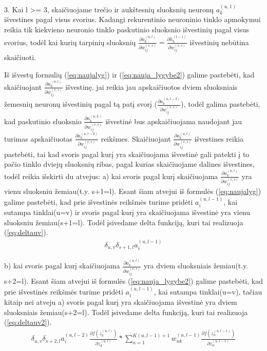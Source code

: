 3. Kai l >= 3, skaičiuojame trečio ir aukštesnių sluoksnių neuronų $a_k^{(u,1)}$ išvestines pagal visus svorius. Kadangi rekurentinio neuroninio tinklo apmokymui reikia tik kiekvieno neuronio tinklo paskutinio sluoksnio išvestinių pagal visus svorius, todėl kai kurių tarpinių sluoksnių $\frac{\partial a_k^{(u, l)}}{\partial w_{ij}^{(v,s)}} = \frac{\partial h_k^{(t-1)}}{\partial w_{ij}^{(v,s)}}$ išvestinių nebūtina skaičiuoti.

Iš išvestų formulių (\ref{eq:naujalyg}) ir (\ref{eq:nauja_lygybe2}) galime pastebėti, kad skaičiuojant $\frac{\partial a_k^{(u, l)}}{\partial w_{ij}^{(v,s)}}$ išvestinę, jai reikia jau apskaičiuotos dviem sluoksniais žemesnių neuronų išvestinių pagal tą patį svorį ($\frac{\partial a_k^{(u, l-2)}}{\partial w_{ij}^{(v,s)}}$), todėl galima pastebėti, kad paskutinio sluoksnio $\frac{\partial a_k^{(u, L)}}{\partial w_{ij}^{(v,s)}}$ išvestinė bus apskaičiuojama naudojant jau turimas apskaičiuotas  $\frac{\partial a_k^{(u, l-2)}}{\partial w_{ij}^{(v,s)}}$ reikšmes. Skaičiuojant $\frac{\partial a_k^{(u, l)}}{\partial w_{ij}^{(v,s)}}$ išvestines reikia pastebėti, tai kad svoris pagal kurį yra skaičiuojama išvestinė gali patekti į to pačio tinklo dviejų sluoksnių ribas, pagal kurias skaičiuojame dalines išvestines, todėl reikia išskirti du atvejus:
  a) kai svoris pagal kurį skaičiuojama $\frac{\partial a_k^{(u, l)}}{\partial w_{ij}^{(v,s)}}$ yra vienu sluoksniu žemiau(t.y. s+1=l).
    Esant šiam atvejui iš formulės (\ref{eq:naujalyg}) galime pastebėti, kad prie išvestinės reikšmės turime pridėti $a_i^{(u,l-1)}$, kai sutampa tinklai(u=v) ir svoris pagal kurį yra skaičiuojama išvestinė yra vienu sluoksniu žemiau(s+1=l). Todėl įsivedame delta funkciją, kuri tai realizuoja (\ref{eq:deltauv}).
    \begin{equation}\label{eq:deltauv}
      \begin{aligned}
        \delta_{u,v}\delta_{s+1,l}a_i^{(u,l-1)}
      \end{aligned}
    \end{equation}

  b) kai svoris pagal kurį skaičiuojama $\frac{\partial a_k^{(u, l)}}{\partial w_{ij}^{(v,s)}}$ yra dviem sluoksniais žemiau(t.y. s+2=l).
  Esant šiam atvejui iš formulės (\ref{eq:nauja_lygybe2}) galime pastebėti, kad prie išvestinės reikšmės turime pridėti $a_i^{(u,l-1)}$, kai sutampa tinklai(u=v), tačiau kitaip nei atveju a) svoris pagal kurį yra skaičiuojama išvestinė yra dviem sluoksniais žemiau(s+2=l). Todėl įsivedame delta funkciją, kuri tai realizuoja (\ref{eq:deltauv2}).
  \begin{equation}\label{eq:deltauv2}
    \begin{aligned}
      \delta_{u,v}\delta_{s+2,l}a_i^{(u,l-2)}\frac{\partial f(z_k^{(u,l)})}{\partial z_k^{(u,l)}}*
        \sum_{n=1}^{K(u,l-1)+1} w_{nk}^{(u,l-1)} \frac{\partial f(z_n^{(u,l-1)})}{\partial z_n^{(u,l-1)}}
    \end{aligned}
  \end{equation}


